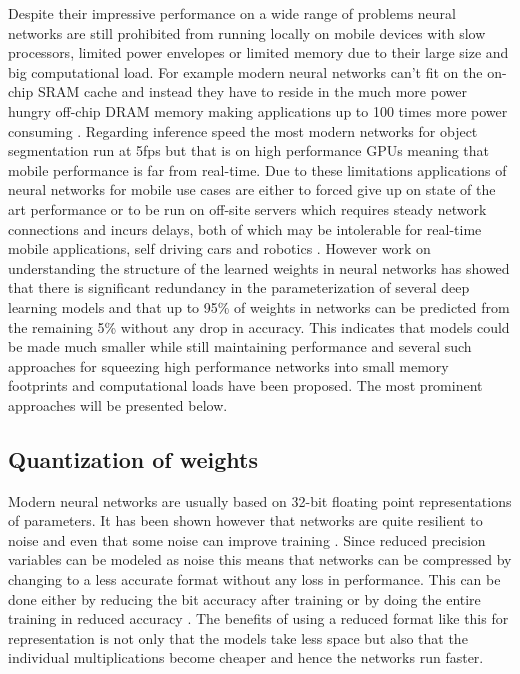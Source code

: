 \documentclass{kththesis}
\newcommand{\bibentry}[1]{\parencite{#1}}
\begin{document}
Despite their impressive performance on a wide range of problems neural networks
are still prohibited from running locally on mobile devices with slow
processors, limited power envelopes or limited memory due to their large size
and big computational load. For example modern neural networks can't fit on the
on-chip SRAM cache and instead they have to reside in the much more power hungry
off-chip DRAM memory making applications up to 100 times more power consuming
\bibentry{han2015learning}. Regarding inference speed the most modern networks
for object segmentation \bibentry{he2017mask} run at 5fps but that is on high
performance GPUs meaning that mobile performance is far from real-time. Due to
these limitations applications of neural networks for mobile use cases are
either to forced give up on state of the art performance or to be run on
off-site servers which requires steady network connections and incurs delays,
both of which may be intolerable for real-time mobile applications, self driving
cars and robotics \bibentry{jin2014flattened}. However work on understanding the
structure of the learned weights in neural networks
\bibentry{denil2013predicting} has showed that there is significant redundancy
in the parameterization of several deep learning models and that up to 95\% of
weights in networks can be predicted from the remaining 5\% without any drop in
accuracy. This indicates that models could be made much smaller while still
maintaining performance and several such approaches for squeezing high
performance networks into small memory footprints and computational loads have
been proposed. The most prominent approaches will be presented below.  

\subsection{Quantization of weights}
Modern neural networks are usually based on 32-bit floating point
representations of parameters. It has been shown however that networks are quite
resilient to noise and even that some noise can improve training
\bibentry{murray1994enhanced}. Since reduced precision variables can be modeled
as noise this means that networks can be compressed by changing to a less
accurate format without any loss in performance. This can be done either by
reducing the bit accuracy after training \bibentry{vanhoucke2011improving}  or
by doing the entire training in reduced accuracy \bibentry{hubara2016quantized}
\bibentry{gupta2015deep}. The benefits of using a reduced format like this for
representation is not only that the models take less space but also that the
individual multiplications become cheaper and hence the networks run faster. 
\end{document}
